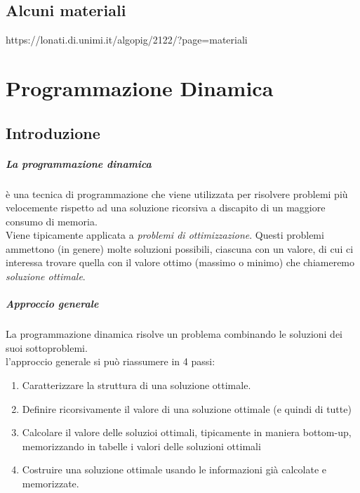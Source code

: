 \documentclass[12pt, a4paper, openany]{book}
\begin{document}
\begin{enumerate}
\end{enumerate}

\section{Alcuni materiali}
https://lonati.di.unimi.it/algopig/2122/?page=materiali

\chapter{Programmazione Dinamica}
\section{Introduzione}
\paragraph{La programmazione dinamica} è una tecnica di programmazione che viene utilizzata per risolvere problemi più velocemente rispetto ad una soluzione ricorsiva a discapito di un maggiore consumo di memoria.
\\Viene tipicamente applicata a \emph{problemi di ottimizzazione}. Questi problemi ammettono (in genere) molte soluzioni possibili, ciascuna con un valore, di cui ci interessa trovare quella con il valore ottimo (massimo o minimo) che chiameremo \emph{soluzione ottimale}.

\paragraph{Approccio generale}
La programmazione dinamica risolve un problema combinando le soluzioni dei suoi sottoproblemi.\\
l'approccio generale si può riassumere in 4 passi:
\begin{enumerate}
	\item Caratterizzare la struttura di una soluzione ottimale.
	\item Definire ricorsivamente il valore di una soluzione ottimale (e quindi di tutte)
	\item Calcolare il valore delle soluzioi ottimali, tipicamente in maniera bottom-up, memorizzando in tabelle i valori delle soluzioni ottimali
	\item Costruire una soluzione ottimale usando le informazioni già calcolate e memorizzate.
\end{enumerate}
\end{document}
